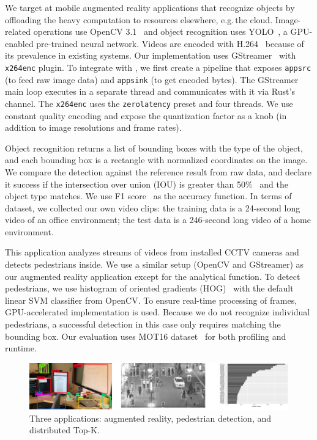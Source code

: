 \documentclass[twocolumn]{article}
\begin{document}
 We target at mobile augmented reality applications
that recognize objects by offloading the heavy computation to resources
elsewhere, e.g.\,the cloud.  Image-related operations use OpenCV
3.1~\cite{opencvlibrary} and object recognition uses YOLO~\cite{darknet13,
  redmon2016yolo9000}, a GPU-enabled pre-trained neural network. Videos are
encoded with H.264~\cite{richardson2011h} because of its prevalence in existing
systems. Our implementation uses GStreamer~\cite{gstreamer} with
\texttt{x264enc} plugin. To integrate with \sysname{}, we first create a
pipeline that exposes \texttt{appsrc} (to feed raw image data) and
\texttt{appsink} (to get encoded bytes). The GStreamer main loop executes in a
separate thread and \sysname{} communicates with it via Rust's channel. The
\texttt{x264enc} uses the \texttt{zerolatency} preset and four threads. We use
constant quality encoding and expose the quantization factor as a knob (in
addition to image resolutions and frame rates).

Object recognition returns a list of bounding boxes with the type of the object,
and each bounding box is a rectangle with normalized coordinates on the
image. We compare the detection against the reference result from raw data, and
declare it success if the intersection over union (IOU) is greater than
50\%~\cite{everingham2010pascal} and the object type matches. We use F1
score~\cite{Rijsbergen:1979:IR:539927} as the accuracy function. In terms of
dataset, we collected our own video clips: the training data is a 24-second long
video of an office environment; the test data is a 246-second long video of a
home environment.

 This application analyzes streams of videos from
installed CCTV cameras and detects pedestrians inside. We use a similar setup
(OpenCV and GStreamer) as our augmented reality application except for the
analytical function. To detect pedestrians, we use histogram of oriented
gradients (HOG)~\cite{dalal2005histograms} with the default linear SVM
classifier from OpenCV. To ensure real-time processing of frames,
GPU-accelerated implementation is used. Because we do not recognize individual
pedestrians, a successful detection in this case only requires matching the
bounding box. Our evaluation uses MOT16 dataset~\cite{milan2016mot16} for both
profiling and runtime.

\begin{figure}
  \centering
  \includegraphics[width=\columnwidth]{figures/apps.pdf}
  \caption{Three applications: augmented reality, pedestrian detection, and
    distributed Top-K.}
  \label{fig:three-apps}
\end{figure}
\end{document}

